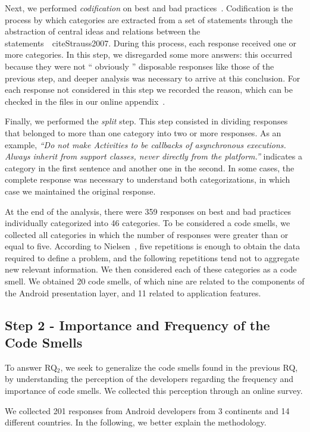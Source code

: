 Next, we performed \textit{codification} on best and bad practices~\cite{Strauss2007, Saldana2013}. Codification is the process by which categories are extracted from a set of statements through the abstraction of central ideas and relations between the statements~\ cite{Strauss2007}. During this process, each response received one or more categories. In this step, we disregarded some more answers: this occurred because they were not `` obviously '' disposable responses like those of the previous step, and deeper analysis was necessary to arrive at this conclusion. For each response not considered in this step we recorded the reason, which can be checked in the files in our online appendix~\cite{apendice}.

Finally, we performed the \textit {split} step. This step consisted in dividing responses that belonged to more than one category into two or more responses.
As an example, \textit{``Do not make Activities to be callbacks of asynchronous executions. Always inherit from support classes, never directly from the platform.''} indicates a category in the first sentence and another one in the second. In some cases, the complete response was necessary to understand both categorizations, in which case we maintained the original response.

At the end of the analysis, there were 359 responses on best and bad practices individually categorized into 46 categories. 
To be considered a code smells, we collected all categories in which the number
of responses were greater than or equal to five.
According to Nielsen~\cite{NielsenMagicNumber:00}, five repetitions is enough to obtain the data required to define a problem, and the following repetitions tend not to aggregate new relevant information. We then considered each of these categories as a code smell.
We obtained 20 code smells, of which nine are related to the components of the Android presentation layer, and 11 related to application features.

\subsection{Step 2 - Importance and Frequency of the Code Smells}

To answer RQ$_2$, we seek to generalize the code smells 
found in the previous RQ, by understanding the perception of the developers regarding the frequency and importance of code smells. We collected this perception through an online survey.

We collected 201 responses from Android developers from 3 continents and 14 different countries. In the following, we better explain the methodology.

